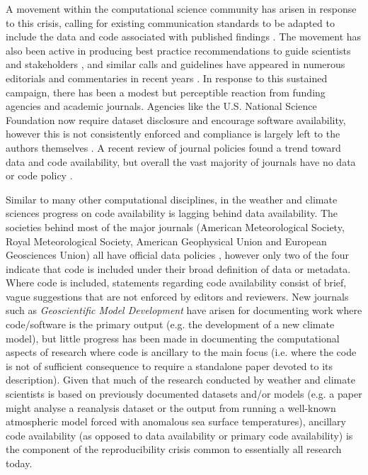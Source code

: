 A movement within the computational science community has arisen in response to this crisis, calling for existing communication standards to be adapted to include the data and code associated with published findings \citep[e.g.][]{Stodden2014}. The movement has also been active in producing best practice recommendations to guide scientists and stakeholders \citep[e.g.][]{Prlic2012,Stodden2012a,Sandve2013,Stodden2014}, and similar calls and guidelines have appeared in numerous editorials and commentaries in recent years \citep[e.g.][]{Barnes2010,Merali2010,Ince2012}. In response to this sustained campaign, there has been a modest but perceptible reaction from funding agencies and academic journals. Agencies like the U.S. National Science Foundation now require dataset disclosure and encourage software availability, however this is not consistently enforced and compliance is largely left to the authors themselves \citep{Stodden2013}. A recent review of journal policies found a trend toward data and code availability, but overall the vast majority of journals have no data or code policy \citep{Stodden2013}. 

Similar to many other computational disciplines, in the weather and climate sciences progress on code availability is lagging behind data availability. The societies behind most of the major journals (American Meteorological Society, Royal Meteorological Society, American Geophysical Union and European Geosciences Union) all have official data policies \citep[e.g.][]{Mayernik2015}, however only two of the four indicate that code is included under their broad definition of data or metadata. Where code is included, statements regarding code availability consist of brief, vague suggestions that are not enforced by editors and reviewers. New journals such as \textit{Geoscientific Model Development} have arisen for documenting work where code/software is the primary output (e.g. the development of a new climate model), but little progress has been made in documenting the computational aspects of research where code is ancillary to the main focus (i.e. where the code is not of sufficient consequence to require a standalone paper devoted to its description). Given that much of the research conducted by weather and climate scientists is based on previously documented datasets and/or models (e.g. a paper might analyse a reanalysis dataset or the output from running a well-known atmospheric model forced with anomalous sea surface temperatures), ancillary code availability (as opposed to data availability or primary code availability) is the component of the reproducibility crisis common to essentially all research today.

